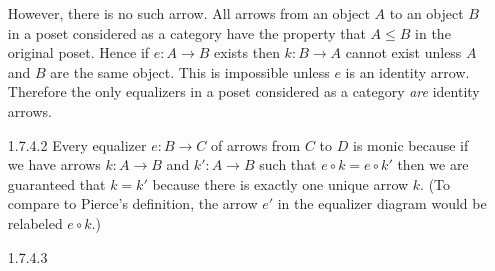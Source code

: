 \documentclass{article}
\begin{document}
\begin{enumerate}
\begin{center}
  \end{center}

  However, there is no such arrow.
  All arrows from an object $A$ to an object $B$ in a poset considered as a category have the property that $A \le B$ in the original poset.
  Hence if $e : A \rightarrow B$ exists then $k : B \rightarrow A$ cannot exist unless $A$ and $B$ are the same object.
  This is impossible unless $e$ is an identity arrow.
  Therefore the only equalizers in a poset considered as a category \emph{are} identity arrows.

\item[]
\item[1.7.4.2]
  Every equalizer $e : B \rightarrow C$ of arrows from $C$ to $D$ is monic because if we have arrows $k : A \rightarrow B$ and $k' : A \rightarrow B$ such that $e \circ k = e \circ k'$ then we are guaranteed that $k = k'$ because there is exactly one unique arrow $k$.
  (To compare to Pierce's definition, the arrow $e'$ in the equalizer diagram would be relabeled $e \circ k$.)
  
\item[]
\item[1.7.4.3]
  
\end{enumerate}
\end{document}
